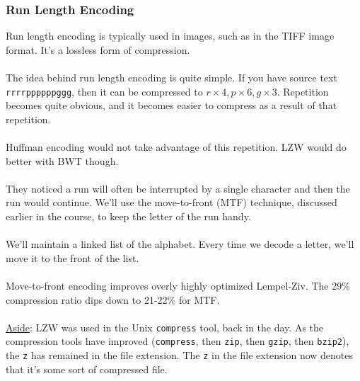 \documentclass[]{article}
\theoremstyle{definition}
\begin{document}
			\subsubsection{Run Length Encoding}
				Run length encoding is typically used in images, such as in the TIFF image format. It's a lossless form of compression.
				\\ \\
				The idea behind run length encoding is quite simple. If you have source text \verb+rrrrppppppggg+, then it can be compressed to $r \times 4, p \times 6, g \times 3$. Repetition becomes quite obvious, and it becomes easier to compress as a result of that repetition.
				\\ \\
				Huffman encoding would not take advantage of this repetition. LZW would do better with BWT though.
				\\ \\
				They noticed a run will often be interrupted by a single character and then the run would continue. We'll use the move-to-front (MTF) technique, discussed earlier in the course, to keep the letter of the run handy.
				\\ \\
				We'll maintain a linked list of the alphabet. Every time we decode a letter, we'll move it to the front of the list.
				\\ \\
				Move-to-front encoding improves overly highly optimized Lempel-Ziv. The 29\% compression ratio dips down to 21-22\% for MTF.
				\\ \\
				\underline{Aside}: LZW was used in the Unix \verb+compress+ tool, back in the day. As the compression tools have improved (\verb+compress+, then \verb+zip+, then \verb+gzip+, then \verb+bzip2+), the \verb+z+ has remained in the file extension. The \verb+z+ in the file extension now denotes that it's some sort of compressed file.
\end{document}
